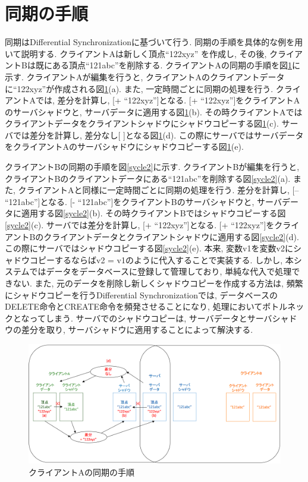 \section{同期の手順}
同期はDifferential Synchronizationに基づいて行う.
同期の手順を具体的な例を用いて説明する. クライアントAは新しく頂点``122xyz''
を作成し, その後, クライアントBは既にある頂点``121abc''を削除する.
クライアントAの同期の手順を図\ref{sycle1}に示す.
クライアントAが編集を行うと, クライアントAのクライアントデータに``122xyz''が作成される図\ref{sycle1}(a).
また, 一定時間ごとに同期の処理を行う. クライアントAでは, 差分を計算し, [+ ``122xyz'']となる. [+ ``122xyz'']をクライアントAのサーバシャドウと, サーバデータに適用する図\ref{sycle1}(b). その時クライアントAではクライアントデータをクライアントシャドウにシャドウコピーする図\ref{sycle1}(c). サーバでは差分を計算し, 差分なし[ ]となる図\ref{sycle1}(d). この際にサーバではサーバデータをクライアントAのサーバシャドウにシャドウコピーする図\ref{sycle1}(e).
\par
クライアントBの同期の手順を図\ref{sycle2}に示す.
クライアントBが編集を行うと, クライアントBのクライアントデータにある``121abc''を削除する図\ref{sycle2}(a).
また, クライアントAと同様に一定時間ごとに同期の処理を行う. 差分を計算し, [-- ``121abc'']となる. [- ``121abc'']をクライアントBのサーバシャドウと, サーバデータに適用する図\ref{sycle2}(b). その時クライアントBではシャドウコピーする図\ref{sycle2}(c). サーバでは差分を計算し, [+ ``122xyz'']となる. [+ ``122xyz'']をクライアントBのクライアントデータとクライアントシャドウに適用する図\ref{sycle2}(d). この際にサーバではシャドウコピーする図\ref{sycle2}(e).
本来, 変数v1を変数v2にシャドウコピーするならばv2 = v1のように代入することで実装する. しかし, 本システムではデータをデータベースに登録して管理しており, 単純な代入で処理できない.
また, 元のデータを削除し新しくシャドウコピーを作成する方法は, 頻繁にシャドウコピーを行うDifferential Synchronizationでは,
データベースのDELETE命令とCREATE命令を頻発させることになり, 処理においてボトルネックとなってしまう. サーバでのシャドウコピーは, サーバデータとサーバシャドウの差分を取り, サーバシャドウに適用することによって解決する.
\begin{figure}[htbp]
  \begin{center}
    \includegraphics[scale=0.45]{images/sycle1}
    \caption{クライアントAの同期の手順}
    \label{sycle1}
  \end{center}
\end{figure}

